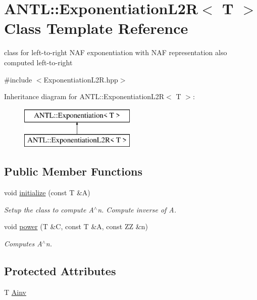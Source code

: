 \hypertarget{classANTL_1_1ExponentiationL2R}{\section{A\-N\-T\-L\-:\-:Exponentiation\-L2\-R$<$ T $>$ Class Template Reference}
\label{classANTL_1_1ExponentiationL2R}
}


class for left-\/to-\/right N\-A\-F exponentiation with N\-A\-F representation also computed left-\/to-\/right  




{\ttfamily \#include $<$Exponentiation\-L2\-R.\-hpp$>$}

Inheritance diagram for A\-N\-T\-L\-:\-:Exponentiation\-L2\-R$<$ T $>$\-:\begin{figure}[H]
\begin{center}
\leavevmode
\includegraphics[height=2.000000cm]{d9/d9e/classANTL_1_1ExponentiationL2R}
\end{center}
\end{figure}
\subsection*{Public Member Functions}
\begin{DoxyCompactItemize}
\item 
void \hyperlink{classANTL_1_1ExponentiationL2R_a671ea84774bd99f2fd73fd41262a81a7}{initialize} (const T \&A)
\begin{DoxyCompactList}\small\item\em Setup the class to compute A$^\wedge$n. Compute inverse of A. \end{DoxyCompactList}\item 
void \hyperlink{classANTL_1_1ExponentiationL2R_a51b38eebbc47e08a4b2ddd1b7f68b313}{power} (T \&C, const T \&A, const Z\-Z \&n)
\begin{DoxyCompactList}\small\item\em Computes A$^\wedge$n. \end{DoxyCompactList}\end{DoxyCompactItemize}
\subsection*{Protected Attributes}
\begin{DoxyCompactItemize}
\item 
T \hyperlink{classANTL_1_1ExponentiationL2R_a1884a23e6c342c6f8f69697c47e6c6e1}{Ainv}
\end{DoxyCompactItemize}



